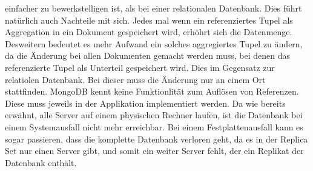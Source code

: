  einfacher zu bewerkstelligen ist, als bei einer relationalen Datenbank. Dies
 führt natürlich auch Nachteile mit sich. Jedes mal wenn ein referenziertes
 Tupel als Aggregation in ein Dokument gespeichert wird, erhöhrt sich die
 Datenmenge. Desweitern bedeutet es mehr Aufwand ein solches aggregiertes Tupel 
 zu ändern, da die Änderung bei allen Dokumenten gemacht werden muss, bei denen
 das referenzierte Tupel als Unterteil gespeichert wird. Dies im Gegensatz zur
 relatiolen Datenbank. Bei dieser muss die Änderung nur an einem Ort
 stattfinden. MongoDB kennt keine Funktionlität zum Auflösen von Referenzen.
 Diese muss jeweils in der Applikation implementiert werden. 
 Da wie bereits erwähnt, alle Server auf einem physischen Rechner
 laufen, ist die Datenbank bei einem Systemausfall nicht mehr erreichbar.
Bei einem Festplattenausfall kann es sogar passieren, dass die komplette
Datenbank verloren geht, da es in der Replica Set nur einen Server gibt, und
somit ein weiter Server fehlt, der ein Replikat der Datenbank enthält.
 
